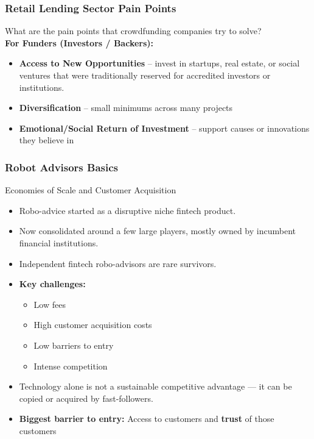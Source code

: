 \begin{frame}
\frametitle{Retail Lending Sector Pain Points}


What are the pain points that crowdfunding companies try to solve? \\
\smallskip 
\textbf{For Funders (Investors / Backers):}
\begin{itemize}
    \item \textbf{Access to New Opportunities} -- invest in startups, real estate, or social ventures that were traditionally reserved for accredited investors or institutions.
    \item \textbf{Diversification} -- small minimums across many projects
    \item \textbf{Emotional/Social Return of Investment} -- support causes or innovations they believe in
\end{itemize}


	
\end{frame} 






\begin{frame}
\frametitle{Robot Advisors Basics}
\vspace{-2mm}
Economies of Scale and Customer Acquisition
\begin{itemize}
  \item Robo-advice started as a disruptive niche fintech product.
  \item Now consolidated around a few large players, mostly owned by incumbent financial institutions.
  \item Independent fintech robo-advisors are rare survivors.
  \item \textbf{Key challenges:}
  \begin{itemize}
    \item Low fees
    \item High customer acquisition costs
    \item Low barriers to entry
    \item Intense competition
  \end{itemize}
  \item Technology alone is not a sustainable competitive advantage — it can be copied or acquired by fast-followers.
  \item \textbf{Biggest barrier to entry:} Access to customers and \textbf{trust} of those customers 
\end{itemize}



\end{frame} 





